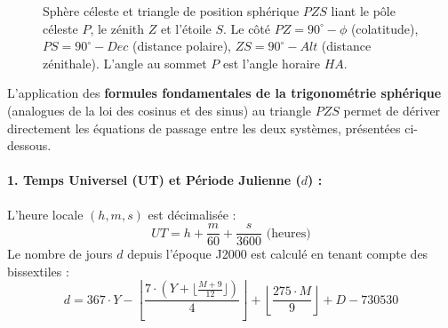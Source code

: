 \documentclass[12pt,a4paper]{report}
\begin{document}
\begin{enumerate}
\begin{figure}[H]
    \centering
    \caption{Sphère céleste et triangle de position sphérique $PZS$ liant le pôle céleste $P$, le zénith $Z$ et l'étoile $S$. Le côté $PZ = 90^\circ - \phi$ (colatitude), $PS = 90^\circ - Dec$ (distance polaire), $ZS = 90^\circ - Alt$ (distance zénithale). L'angle au sommet $P$ est l'angle horaire $HA$.}
    \label{fig:sphere_celeste}
\end{figure}

L'application des \textbf{formules fondamentales de la trigonométrie sphérique} (analogues de la loi des cosinus et des sinus) au triangle $PZS$ permet de dériver directement les équations de passage entre les deux systèmes, présentées ci-dessous.

\paragraph{1. Temps Universel (UT) et Période Julienne ($d$) :}
L'heure locale $(h, m, s)$ est décimalisée :
\begin{equation}
    UT = h + \frac{m}{60} + \frac{s}{3600} \text{ (heures)}
\end{equation}
Le nombre de jours $d$ depuis l'époque J2000 est calculé en tenant compte des bissextiles :
\begin{equation}
    d = 367 \cdot Y - \left\lfloor \frac{7 \cdot \left(Y + \lfloor \frac{M+9}{12} \rfloor\right)}{4} \right\rfloor + \left\lfloor \frac{275 \cdot M}{9} \right\rfloor + D - 730530
\end{equation}


\end{enumerate}
\end{document}
